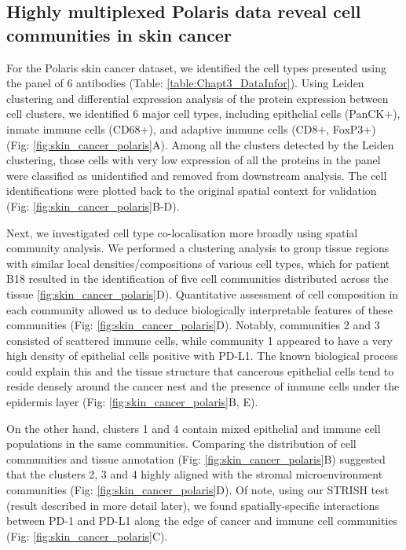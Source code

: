 \subsection{Highly multiplexed Polaris data reveal cell communities in skin cancer}
For the Polaris skin cancer dataset, we identified the cell types presented using the panel of 6 antibodies (Table: \ref{table:Chapt3_DataInfor}). Using Leiden clustering and differential expression analysis of the protein expression between cell clusters, we identified $6$ major cell types, including epithelial cells (PanCK+), inmate immune cells (CD68+), and adaptive immune cells (CD8+, FoxP3+) (Fig: \ref{fig:skin_cancer_polaris}A). Among all the clusters detected by the Leiden clustering, those cells with very low expression of all the proteins in the panel were classified as unidentified and removed from downstream analysis. The cell identifications were plotted back to the original spatial context for validation (Fig: \ref{fig:skin_cancer_polaris}B-D).  

Next, we investigated cell type co-localisation more broadly using spatial community analysis. We performed a clustering analysis to group tissue regions with similar local densities/compositions of various cell types, which for patient B18 resulted in the identification of five cell communities distributed across the tissue \ref{fig:skin_cancer_polaris}D). Quantitative assessment of cell composition in each community allowed us to deduce biologically interpretable features of these communities (Fig: \ref{fig:skin_cancer_polaris}D). Notably, communities 2 and 3 consisted of scattered immune cells, while community 1 appeared to have a very high density of epithelial cells positive with PD-L1. The known biological process could explain this and the tissue structure that cancerous epithelial cells tend to reside densely around the cancer nest and the presence of immune cells under the epidermis layer (Fig: \ref{fig:skin_cancer_polaris}B, E).

On the other hand, clusters 1 and 4 contain mixed epithelial and immune cell populations in the same communities. Comparing the distribution of cell communities and tissue annotation (Fig: \ref{fig:skin_cancer_polaris}B) suggested that the clusters 2, 3 and 4 highly aligned with the stromal microenvironment communities (Fig: \ref{fig:skin_cancer_polaris}D). Of note, using our STRISH test (result described in more detail later), we found spatially-specific interactions between PD-1 and PD-L1 along the edge of cancer and immune cell communities (Fig: \ref{fig:skin_cancer_polaris}C).

